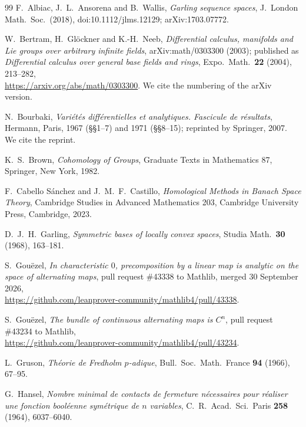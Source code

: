 \begin{thebibliography}{99}
 F.~Albiac, J.~L.~Ansorena and B.~Wallis, \emph{Garling sequence spaces}, J.\ London Math.\ Soc.\ (2018),
doi:10.1112/jlms.12129; arXiv:1703.07772.

 W.~Bertram, H.~Gl\"ockner and K.-H.~Neeb,
\emph{Differential calculus, manifolds and Lie groups over arbitrary infinite fields},
arXiv:math/0303300 (2003); published as \emph{Differential calculus over general base fields and rings}, Expo.\ Math.\ \textbf{22} (2004), 213--282,\\
{\small\url{https://arxiv.org/abs/math/0303300}}. We cite the numbering of the arXiv version.

 N.~Bourbaki, \emph{Vari\'et\'es diff\'erentielles et analytiques. Fascicule de r\'esultats}, Hermann, Paris,
1967 (\S\S1--7) and 1971 (\S\S8--15); reprinted by Springer, 2007. We cite the reprint.

 K.~S.~Brown, \emph{Cohomology of Groups}, Graduate Texts in Mathematics 87, Springer, New York, 1982.

 F.~Cabello S\'anchez and J.~M.~F.~Castillo, \emph{Homological Methods in Banach Space Theory},
Cambridge Studies in Advanced Mathematics 203, Cambridge University Press, Cambridge, 2023.

 D.~J.~H.~Garling, \emph{Symmetric bases of locally convex spaces}, Studia Math.\ \textbf{30} (1968),
163--181.

 S.~Gou\"ezel, \emph{In characteristic $0$, precomposition by a linear map is analytic on the space of
alternating maps}, pull request \#43338 to Mathlib, merged 30 September 2026,\\ {\small\url{https://github.com/leanprover-community/mathlib4/pull/43338}}.

 S.~Gou\"ezel, \emph{The bundle of continuous alternating maps is $C^n$}, pull request \#43234 to Mathlib,\\
{\small\url{https://github.com/leanprover-community/mathlib4/pull/43234}}.

 L.~Gruson, \emph{Th\'eorie de Fredholm $p$-adique}, Bull.\ Soc.\ Math.\ France \textbf{94} (1966), 67--95.

 G.~Hansel, \emph{Nombre minimal de contacts de fermeture n\'ecessaires pour r\'ealiser une fonction
bool\'eenne sym\'etrique de $n$ variables}, C.~R.\ Acad.\ Sci.\ Paris \textbf{258} (1964), 6037--6040.


\end{thebibliography}
